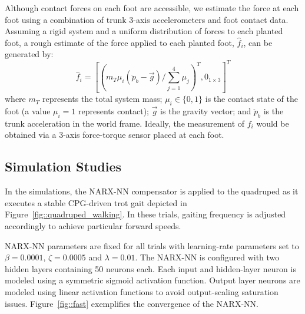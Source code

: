 Although contact forces on each foot are accessible, we estimate the force at each foot using a combination of trunk 3-axis accelerometers and foot contact data. Assuming a rigid system and a uniform distribution of forces to each planted foot, a rough estimate of the force applied to each \Ith planted foot, $\hat{f}_{i}$, can be generated by:
	\vspace{-2mm}
	\begin{equation}
		\hat{f}_{i} = \left[
			\left( {m_{T}\mu_{i}} \left(\ddot{p}_{b} - \vec{g}\right)/{\sum_{j=1}^{4}{\mu_{j}}} \right)^{T},
			0_{1\times3}
		\right]^{T}
	\end{equation}
where $m_{T}$ represents the total system mass; $\mu_{i}\in \{0,1\}$ is the contact state of the \Ith foot (a value $\mu_{i}=1$ represents contact); $\vec{g}$ is the gravity vector; and $\ddot{p}_{b}$ is the trunk acceleration in the world frame. Ideally, the measurement of ${f}_{i}$ would be obtained via a 3-axis force-torque sensor placed at each foot.


\subsection{Simulation Studies}


In the simulations, the NARX-NN compensator is applied to the quadruped as it executes a stable CPG-driven trot gait depicted in  Figure~\ref{fig::quadruped_walking}. In these trials, gaiting frequency is adjusted accordingly to achieve particular forward speeds.

NARX-NN parameters are fixed for all trials with learning-rate  parameters set to $\beta=0.0001$, $\zeta=0.0005$ and $\lambda = 0.01$. The NARX-NN is configured with two hidden layers containing 50 neurons each. Each input and hidden-layer neuron is modeled using a symmetric sigmoid activation function. Output layer neurons are modeled using linear activation functions to avoid output-scaling saturation issues. Figure~\ref{fig::fast} exemplifies the convergence of the NARX-NN. %

